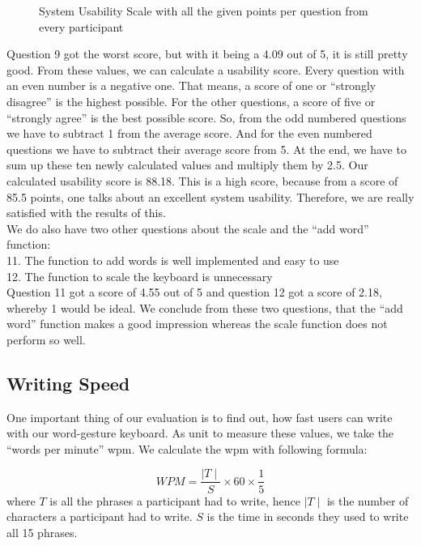 \fi
\begin{figure}[H]
    \noindent
    \vspace*{-10em}
    \caption{System Usability Scale with all the given points per question from every participant}
    \label{fig:SUS_score}
\end{figure}

Question 9 got the worst score, but with it being a 4.09 out of 5, it is still pretty good. From these values, we can calculate a usability score. Every question with an even number is a negative one. That means, a score of one or ``strongly disagree'' is the highest possible. For the other questions, a score of five or ``strongly agree'' is the best possible score. So, from the odd numbered questions we have to subtract 1 from the average score. And for the even numbered questions we have to subtract their average score from 5. At the end, we have to sum up these ten newly calculated values and multiply them by 2.5. Our calculated usability score is 88.18. This is a high score, because from a score of 85.5 points, one talks about an excellent system usability. Therefore, we are really satisfied with the results of this.\\
We do also have two other questions about the scale and the ``add word'' function:\\
11. The function to add words is well implemented and easy to use\\
12. The function to scale the keyboard is unnecessary\\
Question 11 got a score of 4.55 out of 5 and question 12 got a score of 2.18, whereby 1 would be ideal. We conclude from these two questions, that the ``add word'' function makes a good impression whereas the scale function does not perform so well.\\

\subsection{Writing Speed}
One important thing of our evaluation is to find out, how fast users can write with our word-gesture keyboard. As unit to measure these values, we take the ``words per minute'' wpm. We calculate the wpm with following formula: 

\begin{equation}
    WPM = \frac{\mid T \mid}{S} \times 60 \times \frac{1}{5}
\end{equation}
where $T$ is all the phrases a participant had to write, hence $\mid T \mid$ is the number of characters a participant had to write. $S$ is the time in seconds they used to write all 15 phrases.\\

